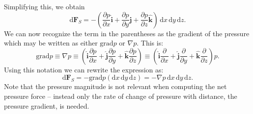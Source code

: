 Simplifying this, we obtain
\[ 
  \mathrm{d}\textbf{F}_S = - \left( \frac{\partial p}{\partial x} \hat{\textbf{i}} + \frac{\partial p}{\partial y} \hat{\textbf{j}} + \frac{\partial p}{\partial z} \hat{\textbf{k}} \right) \, \mathrm{d}x \, \mathrm{d}y \, \mathrm{d}z
.\]
We can now recognize the term in the parentheses as the gradient of the pressure which may be written as either $\mathrm{grad} p$ or $\nabla p$. This is:
\[ 
  \mathrm{grad} p \equiv \nabla p \equiv \left( \hat{\textbf{i}} \frac{\partial p}{\partial x} + \hat{\textbf{j}} \frac{\partial p}{\partial y} + \hat{\textbf{k}} \frac{\partial p}{\partial z}  \right) \equiv \left( \hat{\textbf{i}} \frac{\partial }{\partial x} + \hat{\textbf{j}}\frac{\partial }{\partial y} + \hat{\textbf{k}} \frac{\partial }{\partial z} \right) p
.\]
Using this notation we can rewrite the expression as:
\[ 
\mathrm{d}\textbf{F}_S = - \mathrm{grad} p(\mathrm{d}x \, \mathrm{d}y \, \mathrm{d}z) = - \nabla p \, \mathrm{d}x \, \mathrm{d}y \, \mathrm{d}z
.\]
Note that the pressure magnitude is not relevant when computing the net pressure force -- instead only the rate of change of pressure with distance, the pressure gradient, is needed. 

